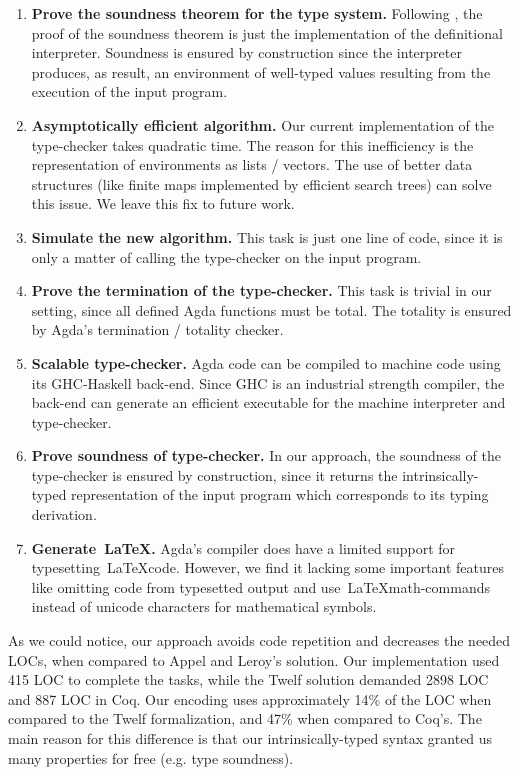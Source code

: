 \documentclass[review]{elsarticle}
\theoremstyle{definition}
\begin{document}
\begin{enumerate}
  \item \textbf{Prove the soundness theorem for the type system.} Following \cite{Amin17}, the proof of the soundness
        theorem is just the implementation of the definitional interpreter. Soundness is ensured by construction since the interpreter
        produces, as result, an environment of well-typed values resulting from the execution of the input program.
  \item \textbf{Asymptotically efficient algorithm.} Our current implementation of the type-checker takes quadratic time. The reason
        for this inefficiency is the representation of environments as lists / vectors. The use of better data structures (like finite
        maps implemented by efficient search trees) can solve this issue. We leave this fix to future work.
  \item \textbf{Simulate the new algorithm.} This task is just one line of code, since it is only a matter of calling the type-checker
        on the input program.
  \item \textbf{Prove the termination of the type-checker.} This task is trivial in our setting, since all defined Agda functions
        must be total. The totality is ensured by Agda's termination / totality checker.
  \item \textbf{Scalable type-checker.} Agda code can be compiled to machine code using its GHC-Haskell back-end. Since GHC is
        an industrial strength compiler, the back-end can generate an efficient executable for the machine interpreter and type-checker.
  \item \textbf{Prove soundness of type-checker.} In our approach, the soundness of the type-checker is ensured by construction,
        since it returns the intrinsically-typed representation of the input program which corresponds to its typing derivation.
  \item \textbf{Generate~\LaTeX.} Agda's compiler does have a limited support for typesetting~\LaTeX code.
        However, we find it lacking some important features like omitting code from typesetted output
        and use~\LaTeX math-commands instead of unicode characters for mathematical symbols.
\end{enumerate}

As we could notice, our approach avoids code repetition and decreases the needed LOCs, when compared to Appel and Leroy's
\cite{Appel07} solution.
Our implementation used 415 LOC to complete the tasks, while the Twelf solution demanded 2898 LOC and 887 LOC in Coq.
Our encoding uses approximately 14\% of the LOC when compared to the Twelf formalization, and 47\% when compared to Coq's. The main
reason for this difference is that our intrinsically-typed syntax granted us many properties for free (e.g. type soundness).
\end{document}
